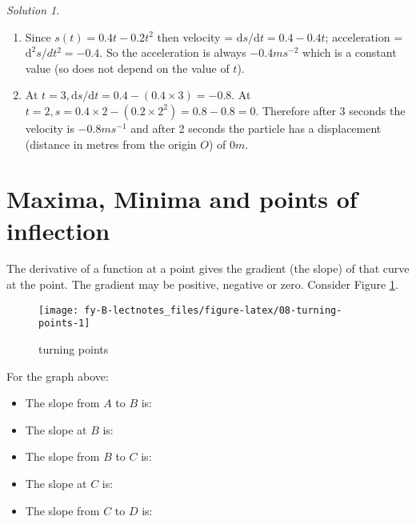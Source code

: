 \documentclass[
  11pt,
  oneside]{book}
\providecommand{\tightlist}{%
  \setlength{\itemsep}{0pt}\setlength{\parskip}{0pt}}
\newcommand{\slide}{}
\theoremstyle{definition}
\theoremstyle{definition}
\theoremstyle{definition}
\theoremstyle{definition}
\theoremstyle{remark}
\newtheorem*{solution}{Solution}
\begin{document}
\begin{solution}
\leavevmode

\begin{enumerate}
\def\labelenumi{\arabic{enumi}.}
\item
  Since \(s(t) = 0.4t-0.2t^2\) then velocity = \(\mathrm{d} s/\mathrm{d} t = 0.4-0.4t\); acceleration = \(\mathrm{d}^{2}s/dt^2 = -0.4\).
  So the acceleration is always \(-0.4ms^{-2}\) which is a constant value (so does not depend on the value of \(t\)).
\item
  At \(t=3, \mathrm{d} s/\mathrm{d} t = 0.4-(0.4\times 3) = -0.8\). At \(t=2, s = 0.4\times2-(0.2\times 2^2) = 0.8-0.8 = 0\). Therefore after \(3\) seconds the velocity is \(-0.8ms^{-1}\) and after 2 seconds the particle has a displacement (distance in metres from the origin \(O\)) of \(0m\).
\end{enumerate}

\end{solution}

\slide

\section{Maxima, Minima and points of inflection}\label{lecture-eight}

The derivative of a function at a point gives the gradient (the slope) of that curve at the point. The gradient may be positive, negative or zero. Consider Figure \ref{fig:08-turning-points}.

\begin{figure}

{\centering \texttt{[image: fy-B-lectnotes\_files/figure-latex/08-turning-points-1]} 

}

\caption{turning points}\label{fig:08-turning-points}
\end{figure}

\slide

For the graph above:

\begin{slidesonly}

\begin{itemize}
\tightlist
\item
  The slope from \(A\) to \(B\) is:
\item
  The slope at \(B\) is:
\item
  The slope from \(B\) to \(C\) is:
\item
  The slope at \(C\) is:
\item
  The slope from \(C\) to \(D\) is:
\end{itemize}

\end{slidesonly}
\end{document}
